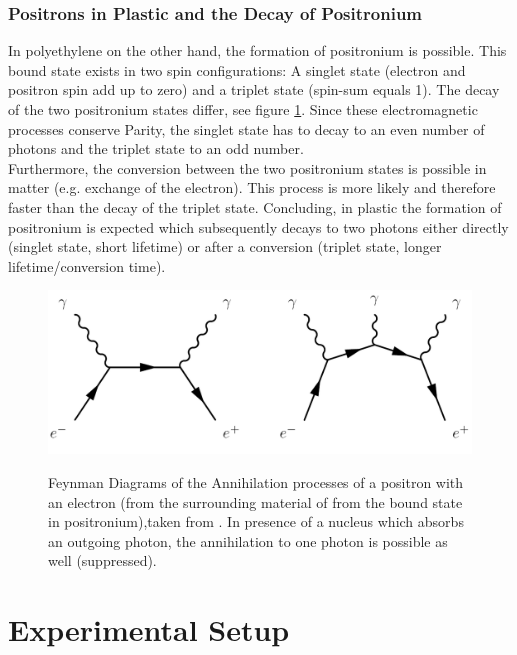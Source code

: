 \documentclass[
	paper=A4,
	parskip=full,
	chapterprefix=true,
	11pt,
	headings=normal,
	bibliography=totoc,
	listof=totoc,
	titlepage=on,
]{scrreprt}
\begin{document}
\subsection{Positrons in Plastic and the Decay of Positronium}

In polyethylene on the other hand, the formation of positronium is possible. This bound state exists in two spin configurations: A singlet state (electron and positron spin add up to zero) and a triplet state (spin-sum equals 1). The decay of the two positronium states differ, see figure \ref{fig:feynman_positronium}. Since these electromagnetic processes conserve Parity, the singlet state has to decay to an even number of photons and the triplet state to an odd number\cite{Lab_manual_T8}. \\
Furthermore, the conversion between the two positronium states is possible in matter (e.g. exchange of the electron). This process is more likely and therefore faster than the decay of the triplet state. Concluding, in plastic the formation of positronium is expected which subsequently decays to two photons either directly (singlet state, short lifetime)  or after a conversion (triplet state, longer lifetime/conversion time).

\begin{figure}
	\centering
	\includegraphics{feynman_positroniumdecay} \\
	\caption{Feynman Diagrams of the Annihilation processes of a positron with an electron (from the surrounding material of from the bound state in positronium),taken from \cite{Lab_manual_T8}. In presence of a nucleus which absorbs an outgoing photon, the annihilation to one photon is possible as well (suppressed).}
	\label{fig:feynman_positronium}
\end{figure}


\chapter{Experimental Setup}
\end{document}
